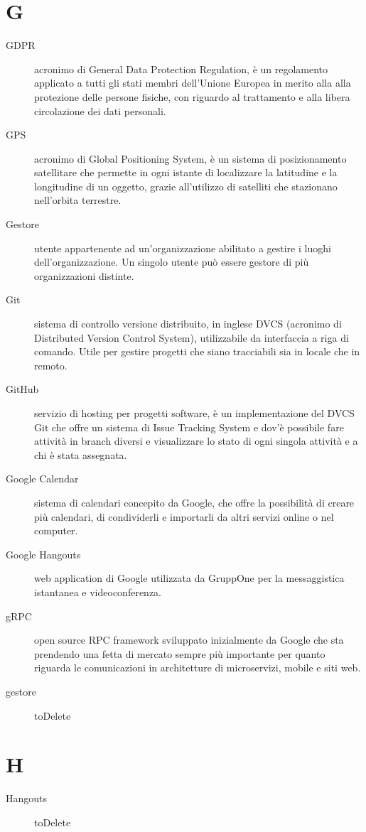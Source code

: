 \documentclass{article}
\begin{document}
  \section{G}
  \begin{description}
    \item[GDPR] acronimo di General Data Protection Regulation, è un regolamento applicato a tutti gli stati membri dell'Unione Europea in merito alla alla protezione delle persone fisiche, con riguardo al trattamento e alla libera circolazione dei dati personali.
    \item[GPS] acronimo di Global Positioning System, è un sistema di posizionamento satellitare che permette in ogni istante di localizzare la latitudine e la longitudine di un oggetto, grazie all'utilizzo di satelliti che stazionano nell'orbita terrestre.
    \item[Gestore] utente appartenente ad un'organizzazione abilitato a gestire i luoghi dell'organizzazione. Un singolo utente può essere gestore di più organizzazioni distinte.
    \item[Git] sistema di controllo versione distribuito, in inglese DVCS (acronimo di Distributed Version Control System), utilizzabile da interfaccia a riga di comando. Utile per gestire progetti che siano tracciabili sia in locale che in remoto.
    \item[GitHub] servizio di hosting per progetti software, è un implementazione del DVCS Git che offre un sistema di Issue Tracking System e dov'è possibile fare attività in branch diversi e visualizzare lo stato di ogni singola attività e a chi è stata assegnata.
    \item[Google Calendar] sistema di calendari concepito da Google, che offre la possibilità di creare più calendari, di condividerli e importarli da altri servizi online o nel computer.
    \item[Google Hangouts] web application di Google utilizzata da GruppOne per la messaggistica istantanea e videoconferenza.
    \item[gRPC] open source RPC framework sviluppato inizialmente da Google che sta prendendo una fetta di mercato sempre più importante per quanto riguarda le comunicazioni in architetture di microservizi, mobile e siti web.
    \item[gestore] toDelete
	\end{description}
  \section{H}
  \begin{description}
    \item[Hangouts] toDelete
	\end{description}
\end{document}
